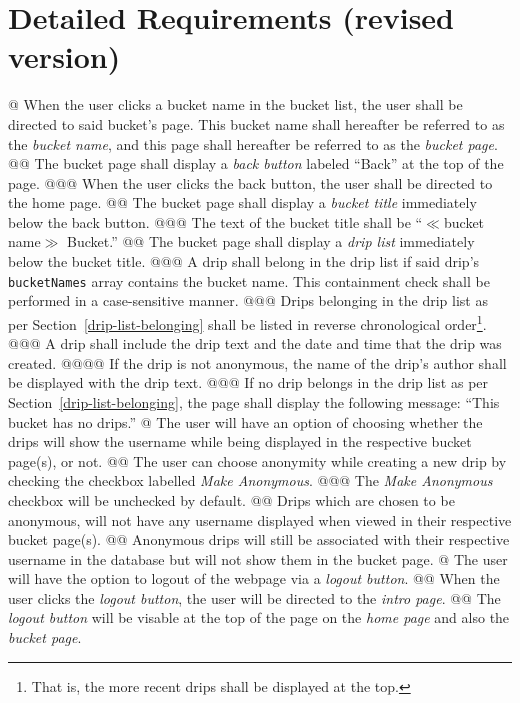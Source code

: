 \documentclass{article}
\begin{document}
\section*{Detailed Requirements (revised version)}

\begin{easylist}[articletoc]
@ When the user clicks a bucket name in the bucket list, the user shall be directed to said bucket's page. This bucket name shall hereafter be referred to as the \textit{bucket name}, and this page shall hereafter be referred to as the \textit{bucket page}.
@@ The bucket page shall display a \textit{back button} labeled ``Back'' at the top of the page.
@@@ When the user clicks the back button, the user shall be directed to the home page.
@@ The bucket page shall display a \textit{bucket title} immediately below the back button.
@@@ The text of the bucket title shall be ``$\ll$bucket name$\gg$ Bucket.''
@@ The bucket page shall display a \textit{drip list} immediately below the bucket title.
@@@ \label{drip-list-belonging}A drip shall belong in the drip list if said drip's \texttt{bucketNames} array contains the bucket name. This containment check shall be performed in a case-sensitive manner.
@@@ Drips belonging in the drip list as per Section~\ref{drip-list-belonging} shall be listed in reverse chronological order\footnote{That is, the more recent drips shall be displayed at the top.}.
@@@ A drip shall include the drip text and the date and time that the drip was created.
@@@@ If the drip is not anonymous, the name of the drip's author shall be displayed with the drip text.
@@@ If no drip belongs in the drip list as per Section~\ref{drip-list-belonging}, the page shall display the following message: ``This bucket has no drips.''
@ The user will have an option of choosing whether the drips will show the username while being displayed in the respective bucket page(s), or not.
@@ The user can choose anonymity while creating a new drip by checking the checkbox labelled \textit{Make Anonymous}.
@@@ The \textit{Make Anonymous} checkbox will be unchecked by default.
@@ Drips which are chosen to be anonymous, will not have any username displayed when viewed in their respective bucket page(s).
@@ Anonymous drips will still be associated with their respective username in the database but will not show them in the bucket page.
@ The user will have the option to logout of the webpage via a \textit{logout button}.
@@ When the user clicks the \textit{logout button}, the user will be directed to the \textit{intro page}.
@@ The \textit{logout button} will be visable at the top of the page on the \textit{home page} and also the \textit{bucket page}.

\end{easylist}
\end{document}
